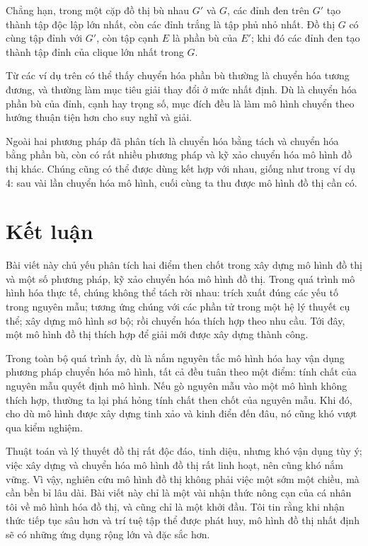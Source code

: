 \documentclass[11pt]{article}
\begin{document}
Chẳng hạn, trong một cặp đồ thị bù nhau \(G'\) và \(G\), các đỉnh đen trên
\(G'\) tạo thành tập độc lập lớn nhất, còn các đỉnh trắng là tập phủ nhỏ
nhất. Đồ thị \(G\) có cùng tập đỉnh với \(G'\), còn tập cạnh \(E\) là phần bù
của \(E'\); khi đó các đỉnh đen tạo thành tập đỉnh của clique lớn nhất trong
\(G\).

Từ các ví dụ trên có thể thấy chuyển hóa phần bù thường là chuyển hóa tương
đương, và thường làm mục tiêu giải thay đổi ở mức nhất định. Dù là chuyển hóa
phần bù của đỉnh, cạnh hay trọng số, mục đích đều là làm mô hình chuyển theo
hướng thuận tiện hơn cho suy nghĩ và giải.

Ngoài hai phương pháp đã phân tích là chuyển hóa bằng tách và chuyển hóa bằng
phần bù, còn có rất nhiều phương pháp và kỹ xảo chuyển hóa mô hình đồ thị
khác. Chúng cũng có thể được dùng kết hợp với nhau, giống như trong ví dụ 4:
sau vài lần chuyển hóa mô hình, cuối cùng ta thu được mô hình đồ thị cần có.

\section{Kết luận}

Bài viết này chủ yếu phân tích hai điểm then chốt trong xây dựng mô hình đồ
thị và một số phương pháp, kỹ xảo chuyển hóa mô hình đồ thị. Trong quá trình
mô hình hóa thực tế, chúng không thể tách rời nhau: trích xuất đúng các yếu
tố trong nguyên mẫu; tương ứng chúng với các phần tử trong một hệ lý thuyết
cụ thể; xây dựng mô hình sơ bộ; rồi chuyển hóa thích hợp theo nhu cầu. Tới
đây, một mô hình đồ thị thích hợp để giải mới được xây dựng thành công.

Trong toàn bộ quá trình ấy, dù là nắm nguyên tắc mô hình hóa hay vận dụng
phương pháp chuyển hóa mô hình, tất cả đều tuân theo một điểm: tính chất của
nguyên mẫu quyết định mô hình. Nếu gò nguyên mẫu vào một mô hình không thích
hợp, thường ta lại phá hỏng tính chất then chốt của nguyên mẫu. Khi đó, cho
dù mô hình được xây dựng tinh xảo và kinh điển đến đâu, nó cũng khó vượt qua
kiểm nghiệm.

Thuật toán và lý thuyết đồ thị rất độc đáo, tinh diệu, nhưng khó vận dụng
tùy ý; việc xây dựng và chuyển hóa mô hình đồ thị rất linh hoạt, nên cũng khó
nắm vững. Vì vậy, nghiên cứu mô hình đồ thị không phải việc một sớm một
chiều, mà cần bền bỉ lâu dài. Bài viết này chỉ là một vài nhận thức nông cạn
của cá nhân tôi về mô hình hóa đồ thị, và cũng chỉ là một khởi đầu. Tôi tin
rằng khi nhận thức tiếp tục sâu hơn và trí tuệ tập thể được phát huy, mô hình
đồ thị nhất định sẽ có những ứng dụng rộng lớn và đặc sắc hơn.
\end{document}
